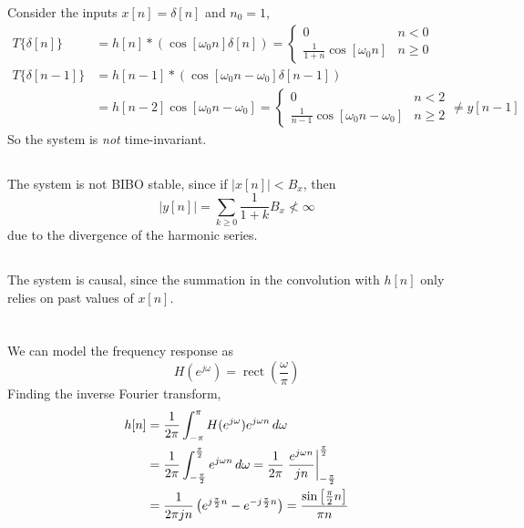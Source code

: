 \documentclass{article}
\DeclareMathOperator{\rect}{rect}
\begin{document}
Consider the inputs \(x[n] = \delta[n]\) and \(n_0 = 1\),
\begin{align}
    T\{\delta[n]\} &= h[n] \ast (\cos[\omega_0 n] \delta[n]) =
    \begin{cases}
        0 & n < 0 \\
        \frac{1}{1 + n} \cos[\omega_0 n] & n \geqslant 0
    \end{cases} \\
    T\{\delta[n - 1]\} &= h[n - 1] \ast (\cos[\omega_0 n - \omega_0] \delta[n - 1]) \\
    &= h[n - 2] \cos[\omega_0 n - \omega_0] =
    \begin{cases}
        0 & n < 2 \\
        \frac{1}{n - 1} \cos[\omega_0 n - \omega_0] & n \geqslant 2
    \end{cases} \neq y[n - 1]
\end{align}
So the system is \emph{not} time-invariant.

\subsection{}

The system is not BIBO stable, since if \(|x[n]| < B_x\), then
\begin{equation}
    |y[n]| = \sum_{k \geqslant 0} \frac{1}{1 + k} B_x \not< \infty
\end{equation}
due to the divergence of the harmonic series.

\subsection{}

The system is causal, since the summation in the convolution with \(h[n]\) only relies on past values of \(x[n]\).

\newpage
\section{}

\subsection{}

We can model the frequency response as
\begin{equation}
    H(e^{j \omega}) = \rect\left(\frac{\omega}{\pi}\right)
\end{equation}
Finding the inverse Fourier transform,
\begin{align}
    h[n] &= \frac{1}{2\pi} \int_{-\pi}^\pi H(e^{j \omega}) e^{j \omega n} \, d\omega \\
    &= \frac{1}{2\pi} \int_{-\frac{\pi}{2}}^{\frac{\pi}{2}} e^{j \omega n} \, d\omega = \frac{1}{2\pi} \eval{\frac{e^{j \omega n}}{jn}}_{-\frac{\pi}{2}}^{\frac{\pi}{2}} \\
    &= \frac{1}{2\pi j n} \left(e^{j \frac{\pi}{2} n} - e^{-j \frac{\pi}{2} n}\right) = \frac{\sin\left[\frac{\pi}{2} n\right]}{\pi n}
\end{align}
\end{document}
